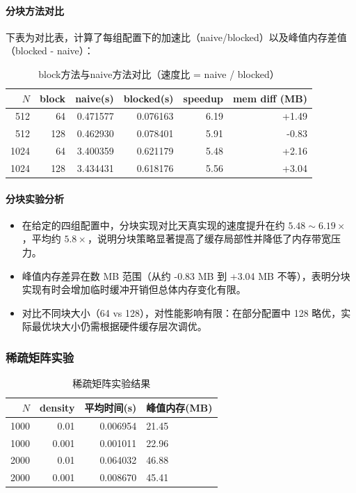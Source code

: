 \documentclass{SYSUReport}
\begin{document}
\newpage

\paragraph{分块方法对比}

下表为对比表，计算了每组配置下的加速比（naive/blocked）以及峰值内存差值（blocked - naive）：
\begin{table}[htbp]
\centering
\label{tab:mem-compare}
\begin{tabular}{rrr r r r}
\toprule
$N$ & block & naive(s) & blocked(s) & speedup & mem diff (MB) \\
\midrule
512 & 64  & 0.471577 & 0.076163 & 6.19 & +1.49 \\
512 & 128 & 0.462930 & 0.078401 & 5.91 & -0.83 \\
1024 & 64  & 3.400359 & 0.621179 & 5.48 & +2.16 \\
1024 & 128 & 3.434431 & 0.618176 & 5.56 & +3.04 \\
\bottomrule
\end{tabular}
\caption{block方法与naive方法对比（速度比 = naive / blocked）}
\end{table}

\paragraph{分块实验分析}

\begin{itemize}
    \item 在给定的四组配置中，分块实现对比天真实现的速度提升在约 $5.48\sim6.19\times$，平均约 $5.8\times$，说明分块策略显著提高了缓存局部性并降低了内存带宽压力。
    \item 峰值内存差异在数 MB 范围（从约 -0.83 MB 到 +3.04 MB 不等），表明分块实现有时会增加临时缓冲开销但总体内存变化有限。
    \item 对比不同块大小（64 vs 128），对性能影响有限：在部分配置中 128 略优，实际最优块大小仍需根据硬件缓存层次调优。
\end{itemize}

\subsubsection{稀疏矩阵实验}
\begin{table}[htbp]
\centering
\begin{tabular}{rrrl}
\toprule
$N$ & density & 平均时间(s) & 峰值内存(MB) \\
\midrule
1000 & 0.01 & 0.006954 & 21.45 \\
1000 & 0.001 & 0.001011 & 22.96 \\
2000 & 0.01 & 0.064032 & 46.88 \\
2000 & 0.001 & 0.008670 & 45.41 \\
\bottomrule
\end{tabular}
\caption{稀疏矩阵实验结果}
\end{table}
\end{document}
